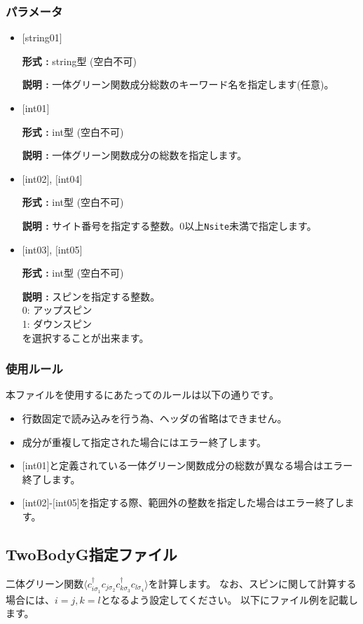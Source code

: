 \subsubsection{パラメータ}
 \begin{itemize}

   \item  $[$string01$]$
   
    {\bf 形式 :} string型 (空白不可)

   {\bf 説明 :} 一体グリーン関数成分総数のキーワード名を指定します(任意)。

   \item  $[$int01$]$
   
    {\bf 形式 :} int型 (空白不可)

   {\bf 説明 :} 一体グリーン関数成分の総数を指定します。

  \item  $[$int02$]$, $[$int04$]$

 {\bf 形式 :} int型 (空白不可)

{\bf 説明 :} サイト番号を指定する整数。0以上\verb|Nsite|{未満}で指定します。
 
  \item  $[$int03$]$, $[$int05$]$

 {\bf 形式 :} int型 (空白不可)

{\bf 説明 :} スピンを指定する整数。\\
0: アップスピン\\
1: ダウンスピン\\
を選択することが出来ます。

\end{itemize}

\subsubsection{使用ルール}
本ファイルを使用するにあたってのルールは以下の通りです。
\begin{itemize}
\item 行数固定で読み込みを行う為、ヘッダの省略はできません。
\item 成分が重複して指定された場合にはエラー終了します。
\item $[$int01$]$と定義されている一体グリーン関数成分の総数が異なる場合はエラー終了します。
\item $[$int02$]$-$[$int05$]$を指定する際、範囲外の整数を指定した場合はエラー終了します。
\end{itemize}

\newpage
\subsection{TwoBodyG指定ファイル}
\label{Subsec:twobodyg}
二体グリーン関数$\langle c_{i\sigma_1}^{\dagger}c_{j\sigma_2}c_{k\sigma_3}^{\dagger}c_{l\sigma_4}\rangle$を計算します。
{なお、スピンに関して計算する場合には、$i=j, k=l$となるよう設定してください。}
以下にファイル例を記載します。

